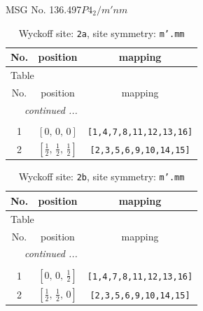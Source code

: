 \documentclass[fleqn,8pt]{jsarticle}
\begin{document}
\setcounter{MaxMatrixCols}{32}

\renewcommand{\tablename}{Table~}
\renewcommand{\figurename}{Figure~}
\begin{center}
\LARGE
MSG No. 136.497\quad$P4_{2}/m'nm$
\end{center}
\renewcommand{\arraystretch}{1.2}
\begin{longtable}{ccc}
\caption{Wyckoff site: {\tt 2a}, site symmetry: {\tt m'.mm}}
 \\
 \hline \hline
No. & position & mapping \\ \hline \endfirsthead

\multicolumn{2}{l}{\tablename\ \thetable{}} \\
 \hline \hline
No. & position & mapping \\ \hline \endhead

 \hline \hline
\multicolumn{2}{r}{\footnotesize\it continued ...} \\ \endfoot

 \hline \hline
\multicolumn{2}{r}{} \\ \endlastfoot

1 & $\left[ 0,\, 0,\, 0 \right]$ & {\tt [1,4,7,8,11,12,13,16]} \\ \hline
2 & $\left[ \frac{1}{2},\, \frac{1}{2},\, \frac{1}{2} \right]$ & {\tt [2,3,5,6,9,10,14,15]} \\
\end{longtable}
\renewcommand{\arraystretch}{1.2}
\begin{longtable}{ccc}
\caption{Wyckoff site: {\tt 2b}, site symmetry: {\tt m'.mm}}
 \\
 \hline \hline
No. & position & mapping \\ \hline \endfirsthead

\multicolumn{2}{l}{\tablename\ \thetable{}} \\
 \hline \hline
No. & position & mapping \\ \hline \endhead

 \hline \hline
\multicolumn{2}{r}{\footnotesize\it continued ...} \\ \endfoot

 \hline \hline
\multicolumn{2}{r}{} \\ \endlastfoot

1 & $\left[ 0,\, 0,\, \frac{1}{2} \right]$ & {\tt [1,4,7,8,11,12,13,16]} \\ \hline
2 & $\left[ \frac{1}{2},\, \frac{1}{2},\, 0 \right]$ & {\tt [2,3,5,6,9,10,14,15]} \\
\end{longtable}
\end{document}
